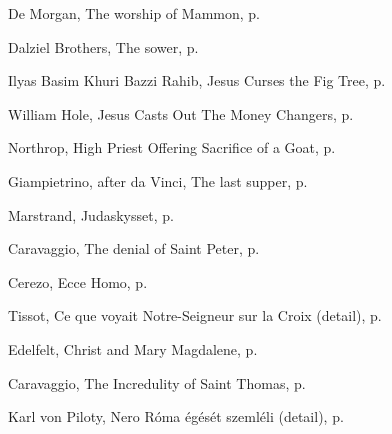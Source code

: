 \documentclass[10pt,twoside]{article} %
\newcommand{\artcredit}[3]{#2, #3, p.~\pageref{fig:#1}}
\begin{document}
\artcredit{mammon}{De Morgan}{The worship of Mammon}

\artcredit{sower}{Dalziel Brothers}{The sower}

\artcredit{cursing-fig-tree}{Ilyas Basim Khuri Bazzi Rahib}{Jesus Curses the Fig Tree}

\artcredit{money-changers-william-hole}{William Hole}{Jesus Casts Out The Money Changers}

\artcredit{altar}{Northrop}{High Priest Offering Sacrifice of a Goat}

\artcredit{last-supper}{Giampietrino, after da Vinci}{The last supper}

\artcredit{judas-kiss}{Marstrand}{Judaskysset}

\artcredit{denial-of-saint-peter}{Caravaggio}{The denial of Saint Peter}

\artcredit{ecce-homo}{Cerezo}{Ecce Homo}

\artcredit{what-our-lord-saw-from-the-cross-detail}{Tissot}{Ce que voyait Notre-Seigneur sur la Croix (detail)}

\artcredit{resurrection-mary-magdalene}{Edelfelt}{Christ and Mary Magdalene}

\artcredit{doubting-thomas}{Caravaggio}{The Incredulity of Saint Thomas}

\artcredit{nero}{Karl von Piloty}{Nero Róma égését szemléli (detail)}
\end{document}
